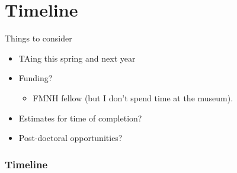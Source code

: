 \documentclass{beamer}
\begin{document}
\section{Timeline}
\begin{frame}
  \begin{block}{Things to consider}
    \begin{itemize}
      \item TAing this spring and next year
      \item Funding?
        \begin{itemize}
          \item FMNH fellow (but I don't spend time at the museum).
        \end{itemize}
      \item Estimates for time of completion?
      \item Post-doctoral opportunities?
    \end{itemize}
  \end{block}
\end{frame}

\begin{frame}
  \frametitle{Timeline}
\end{frame}
\end{document}
